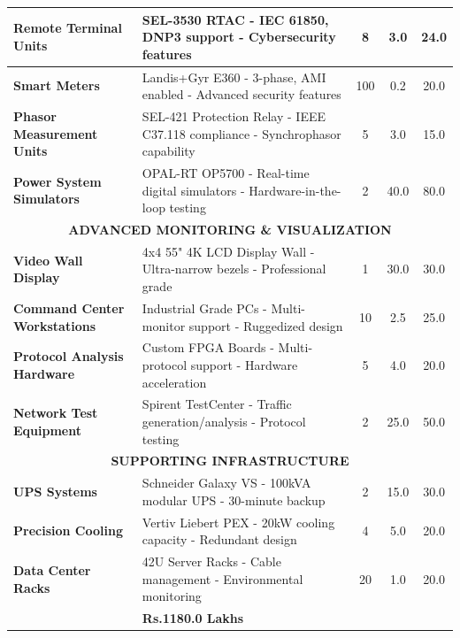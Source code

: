 \documentclass[12pt,a4paper]{article}
\begin{document}
\begin{longtable}{|p{4cm}|p{6cm}|c|c|c|}
\textbf{Remote Terminal Units} & 
SEL-3530 RTAC
- IEC 61850, DNP3 support
- Cybersecurity features & 8 & 3.0 & 24.0 \\
\hline

\textbf{Smart Meters} & 
Landis+Gyr E360
- 3-phase, AMI enabled
- Advanced security features & 100 & 0.2 & 20.0 \\
\hline

\textbf{Phasor Measurement Units} & 
SEL-421 Protection Relay
- IEEE C37.118 compliance
- Synchrophasor capability & 5 & 3.0 & 15.0 \\
\hline

\textbf{Power System Simulators} & 
OPAL-RT OP5700
- Real-time digital simulators
- Hardware-in-the-loop testing & 2 & 40.0 & 80.0 \\
\hline

\multicolumn{5}{|c|}{\cellcolor{gray}\textbf{ADVANCED MONITORING \& VISUALIZATION}} \\
\hline

\textbf{Video Wall Display} & 
4x4 55" 4K LCD Display Wall
- Ultra-narrow bezels
- Professional grade & 1 & 30.0 & 30.0 \\
\hline

\textbf{Command Center Workstations} & 
Industrial Grade PCs
- Multi-monitor support
- Ruggedized design & 10 & 2.5 & 25.0 \\
\hline

\textbf{Protocol Analysis Hardware} & 
Custom FPGA Boards
- Multi-protocol support
- Hardware acceleration & 5 & 4.0 & 20.0 \\
\hline

\textbf{Network Test Equipment} & 
Spirent TestCenter
- Traffic generation/analysis
- Protocol testing & 2 & 25.0 & 50.0 \\
\hline

\multicolumn{5}{|c|}{\cellcolor{gray}\textbf{SUPPORTING INFRASTRUCTURE}} \\
\hline

\textbf{UPS Systems} & 
Schneider Galaxy VS
- 100kVA modular UPS
- 30-minute backup & 2 & 15.0 & 30.0 \\
\hline

\textbf{Precision Cooling} & 
Vertiv Liebert PEX
- 20kW cooling capacity
- Redundant design & 4 & 5.0 & 20.0 \\
\hline

\textbf{Data Center Racks} & 
42U Server Racks
- Cable management
- Environmental monitoring & 20 & 1.0 & 20.0 \\
\hline

\rowcolor{yellow}
\multicolumn{4}{|c|}{\textbf{TOTAL CAPITAL EQUIPMENT}} & \textbf{Rs.1180.0 Lakhs} \\
\hline

\end{longtable}
\end{document}
